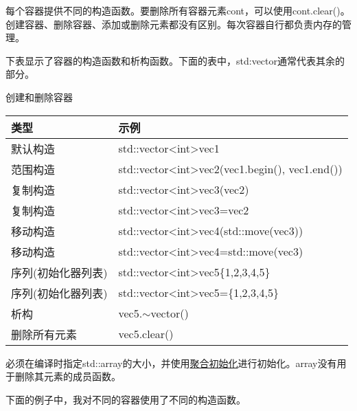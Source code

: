每个容器提供不同的构造函数。要删除所有容器元素cont，可以使用cont.clear()。创建容器、删除容器、添加或删除元素都没有区别。每次容器自行都负责内存的管理。

下表显示了容器的构造函数和析构函数。下面的表中，std:vector通常代表其余的部分。

\begin{center}
创建和删除容器
\end{center}

\begin{longtable}[c]{|l|l|}
\hline
\textbf{类型}   & \textbf{示例}                                            \\ \hline
\endfirsthead
%
\endhead
%
默认构造         & std::vector\textless{}int\textgreater vec1                  \\ \hline
范围构造                      & std::vector\textless{}int\textgreater vec2(vec1.begin(), vec1.end()) \\ \hline
复制构造            & std::vector\textless{}int\textgreater vec3(vec2)            \\ \hline
复制构造            & std::vector\textless{}int\textgreater vec3=vec2             \\ \hline
移动构造            & std::vector\textless{}int\textgreater vec4(std::move(vec3)) \\ \hline
移动构造            & std::vector\textless{}int\textgreater vec4=std::move(vec3)  \\ \hline
序列(初始化器列表) & std::vector\textless{}int\textgreater vec5\{1,2,3,4,5\}              \\ \hline
序列(初始化器列表) & std::vector\textless{}int\textgreater vec5=\{1,2,3,4,5\}             \\ \hline
析构      & vec5.$\sim$vector()                                         \\ \hline
删除所有元素 & vec5.clear()                                                \\ \hline
\end{longtable}

必须在编译时指定std::array的大小，并使用\href{https://en.cppreference.com/w/cpp/language/aggregate_initialization}{聚合初始化}进行初始化。array没有用于删除其元素的成员函数。

下面的例子中，我对不同的容器使用了不同的构造函数。


